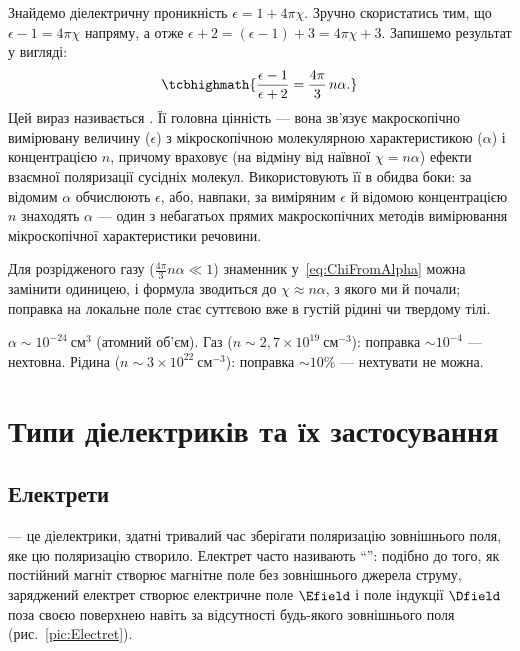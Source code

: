 Знайдемо діелектричну проникність  $\epsilon = 1+4\pi\chi$. Зручно скористатись тим, що $\epsilon - 1 = 4\pi\chi$ напряму, а
отже $\epsilon + 2 = (\epsilon-1) + 3 = 4\pi\chi + 3$. Запишемо результат у вигляді:
\begin{equation}\label{eq:ClausiusMossotti}
	\tcbhighmath{
		\frac{\epsilon - 1}{\epsilon + 2} = \frac{4\pi}{3}\, n\alpha.
	}
\end{equation}
Цей вираз називається . Її головна цінність --- вона  зв'язує макроскопічно вимірювану величину ($\epsilon$) з
мікроскопічною молекулярною характеристикою ($\alpha$) і концентрацією $n$, причому враховує (на відміну від наївної $\chi = n\alpha$) ефекти
взаємної поляризації сусідніх молекул. Використовують її в обидва боки: за відомим $\alpha$ обчислюють $\epsilon$, або, навпаки, за виміряним
$\epsilon$ й відомою концентрацією $n$ знаходять $\alpha$ --- один з небагатьох прямих макроскопічних методів вимірювання мікроскопічної
характеристики речовини.

Для розрідженого газу ($\frac{4\pi}{3}n\alpha\ll1$) знаменник у~\eqref{eq:ChiFromAlpha} можна замінити одиницею, і формула зводиться до $\chi\approx n\alpha$, з якого ми й почали; поправка на локальне поле стає суттєвою вже в густій рідині чи твердому тілі.

\begin{Attention}
	 $\alpha \sim 10^{-24}\ \text{см}^3$ (атомний об'єм). Газ ($n\sim2{,}7\times10^{19}\ \text{см}^{-3}$): поправка $\sim10^{-4}$ ---
	нехтовна. Рідина ($n\sim3\times10^{22}\ \text{см}^{-3}$): поправка $\sim10\%$ --- нехтувати не можна.
\end{Attention}


\section{Типи діелектриків та їх застосування}

\subsection*{Електрети}

 --- це діелектрики, здатні тривалий час зберігати поляризацію  зовнішнього поля, яке цю поляризацію створило.
Електрет часто називають \enquote{}: подібно до того, як постійний магніт створює магнітне поле без
зовнішнього джерела струму, заряджений електрет створює електричне поле $\Efield$ і поле індукції $\Dfield$ поза своєю поверхнею навіть за
відсутності будь-якого зовнішнього поля (рис.~\ref{pic:Electret}).

